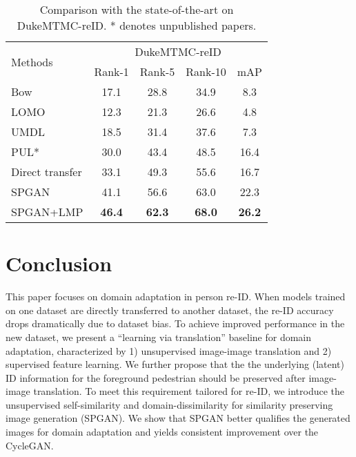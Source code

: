 \documentclass[10pt,twocolumn,letterpaper]{article}
\begin{document}
\setlength{\tabcolsep}{6pt}
\begin{table}[t]
\setlength{\belowcaptionskip}{-0.2cm}
\begin{center}
\begin{tabular}{l|cccc}
\hline
\multicolumn{1}{l|}{\multirow{2}{*}{Methods}}&\multicolumn{4}{c}{DukeMTMC-reID}\\
\cline{2-5}
\multicolumn{1}{c|}{}&Rank-1&Rank-5&Rank-10&mAP\\
\hline
\hline
Bow\cite{DBLP:conf/iccv/ZhengSTWWT15}&17.1&28.8&34.9&8.3\\
LOMO\cite{DBLP:conf/cvpr/LiaoHZL15}&12.3&21.3&26.6&4.8\\
\hline
UMDL\cite{DBLP:conf/cvpr/PengXWPGHT16}&18.5&31.4&37.6&7.3\\
PUL\cite{fan17unsupervised}*&30.0&43.4&48.5&16.4\\
Direct transfer &33.1&49.3&55.6&16.7\\
\hline
SPGAN& 41.1&56.6&63.0&22.3 \\
{SPGAN+LMP}&\textbf{46.4}&\textbf{62.3}&\textbf{68.0}&\textbf{26.2}\\
\hline

\end{tabular}
\end{center}
\setlength{\abovecaptionskip}{-0.1cm} 
\caption{Comparison with the state-of-the-art on DukeMTMC-reID. * denotes unpublished papers.}
\label{table:sota-duke}
\end{table}


\section{Conclusion}
This paper focuses on domain adaptation in person re-ID. When models trained on one dataset are directly transferred to another dataset, the re-ID accuracy drops dramatically due to dataset bias. To achieve improved performance in the new dataset, we present a ``learning via translation'' baseline for domain adaptation, characterized by 1) unsupervised image-image translation and 2) supervised feature learning. 
We further propose that the the underlying (latent) ID information for the foreground pedestrian should be preserved after image-image translation. To meet this requirement tailored for re-ID, we introduce the unsupervised self-similarity and domain-dissimilarity for similarity preserving image generation (SPGAN). We show that SPGAN better qualifies the generated images for domain adaptation and yields consistent improvement over the CycleGAN. 


{\small


}
\end{document}
